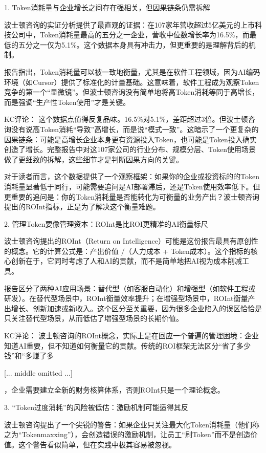 \documentclass[11pt]{ctexart}
\begin{document}
1. Token消耗量与企业增长之间存在强相关，但因果链条仍需拆解

波士顿咨询的实证分析提供了最直观的证据：在107家年营收超过5亿美元的上市科技公司中，Token消耗量最高的五分之一企业，营收中位数增长率为16.5\%，而最低的五分之一仅为5.1\%。这个数据本身具有冲击力，但更重要的是理解背后的机制。

报告指出，Token消耗量可以被一致地衡量，尤其是在软件工程领域，因为AI编码环境（如Cursor）提供了标准化的计量基础。这意味着，软件工程成为观察Token竞争的第一个“显微镜”。但波士顿咨询没有简单地将高Token消耗等同于高增长，而是强调“生产性Token使用”才是关键。

KC评论： 这个数据点值得反复品味。16.5\%对5.1\%，差距超过3倍。但波士顿咨询没有说高Token消耗“导致”高增长，而是说“模式一致”。这暗示了一个更复杂的因果链条：可能是高增长企业本身更有资源投入Token，也可能是Token投入确实创造了增长。完整报告中对这107家公司的行业分布、规模分层、Token使用场景做了更细致的拆解，这些细节才是判断因果方向的关键。

对于读者而言，这个数据提供了一个观察框架：如果你的企业或投资标的的Token消耗量显著低于同行，可能需要追问是AI部署滞后，还是Token使用效率低下。但更重要的追问是：你的Token消耗量是否能转化为可衡量的业务产出？波士顿咨询提出的ROInt指标，正是为了解决这个衡量难题。

2. 管理Token要像管理资本：ROInt是比ROI更精准的AI衡量标尺

波士顿咨询提出的ROInt（Return on Intelligence）可能是这份报告最具有原创性的概念。它的计算公式是：产出价值 /（人力成本 + Token成本）。这个指标的核心创新在于，它同时考虑了人和AI的贡献，而不是简单地把AI视为成本削减工具。

报告区分了两种AI应用场景：替代型（如客服自动化）和增强型（如软件工程或研发）。在替代型场景中，ROInt衡量效率提升；在增强型场景中，ROInt衡量产出增长、创新加速或新收入。这个区分至关重要，因为很多企业陷入的误区恰恰是只关注替代型场景，从而低估了增强型场景的长期价值。

KC评论： 波士顿咨询的ROInt概念，实际上是在回应一个普遍的管理困境：企业知道AI重要，但不知道如何衡量它的贡献。传统的ROI框架无法区分“省了多少钱”和“多赚了多

[... middle omitted ...]

，企业需要建立全新的财务核算体系，否则ROInt只是一个理论概念。

3. “Token过度消耗”的风险被低估：激励机制可能适得其反

波士顿咨询提出了一个尖锐的警告：如果企业只关注最大化Token消耗量（他们称之为“Tokenmaxxing”），会创造错误的激励机制，让员工“刷Token”而不是创造价值。这个警告看似简单，但在实践中极其容易被忽视。
\end{document}
